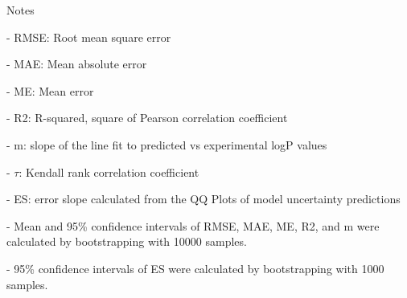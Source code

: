 \documentclass{article}
\begin{document}
Notes

- RMSE: Root mean square error

- MAE: Mean absolute error

- ME: Mean error

- R2: R-squared, square of Pearson correlation coefficient

- m: slope of the line fit to predicted vs experimental logP values

- $\tau$:  Kendall rank correlation coefficient

- ES: error slope calculated from the QQ Plots of model uncertainty predictions

- Mean and 95\% confidence intervals of RMSE, MAE, ME, R2, and m were calculated by bootstrapping with 10000 samples.

- 95\% confidence intervals of ES were calculated by bootstrapping with 1000 samples.\end{document}
\end{document}
